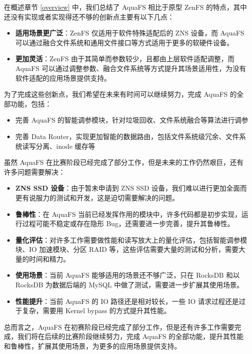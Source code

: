 在概述章节 \ref{overview} 中，我们总结了 AquaFS 相比于原型 ZenFS 的特点，其中还没有实现或者实现得还不够的创新点主要有以下几点：

\begin{itemize}
  \item \textbf{适用场景更广泛}：ZenFS 仅适用于软件特殊适配后的 ZNS 设备，而 AquaFS 可以通过融合文件系统和通用文件接口等方式适用于更多的软硬件设备。
  \item \textbf{更加灵活}：ZenFS 由于其简单而参数较少，且都由上层软件适配调整，而 AquaFS 可以通过调整参数、融合文件系统等方式提升其场景适用性，为没有软件适配的应用场景提供支持。
\end{itemize}

为了完成这些创新点，我们希望在未来有时间可以继续努力，完成 AquaFS 的全部功能，包括：

\begin{itemize}
  \item 完善 AquaFS 的智能调参模块，针对垃圾回收、文件系统融合等算法进行调参
  \item 完善 Data Router，实现更加智能的数据路由，包括文件系统级冗余、文件系统读写分离、inode 缓存等
\end{itemize}

虽然 AquaFS 在比赛阶段已经完成了部分工作，但是未来的工作仍然艰巨，还有许多问题需要解决：

\begin{itemize}
  \item \textbf{ZNS SSD 设备}：由于暂未申请到 ZNS SSD 设备，我们难以进行更加全面而更有说服力的测试和开发，这是迫切需要解决的问题。
  \item \textbf{鲁棒性}：在 AquaFS 当前已经发挥作用的模块中，许多代码都是初步实现，运行过程可能不稳定或存在隐形 Bug，还需要进一步完善，提升其鲁棒性。
  \item \textbf{量化评估}：对许多工作需要做性能和读写放大上的量化评估，包括智能调参模块、IO 加速模块、分区 RAID 等，这些评估需要大量的测试和分析，需要大量的时间和精力。
  \item \textbf{使用场景}：当前 AquaFS 能够适用的场景还不够广泛，只在 RocksDB 和以 RocksDB 为数据后端的 MySQL 中做了测试，需要进一步扩展其使用场景。
  \item \textbf{性能提升}：当前 AquaFS 的 IO 路径还是相对较长，一些 IO 请求过程还是过于复杂，需要用 Kernel bypass 的方式提升其性能。
\end{itemize}

总而言之，AquaFS 在初赛阶段已经完成了部分工作，但是还有许多工作需要完成，我们将在后续的比赛阶段继续努力，完成 AquaFS 的全部功能，提升其性能和鲁棒性，扩展其使用场景，为更多的应用场景提供支持。

\begin{table}[htbp]
  \centering
  
\end{table}